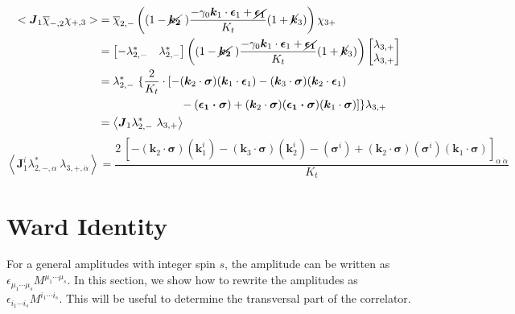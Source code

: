 \documentclass[11pt,a4paper]{article}
\begin{document}
\begin{align*}
< \boldsymbol{J}_{1}\overline{\chi }_{-,2} \chi _{+,3}>  & =\overline{\chi }_{2,-}\left( (1-\cancel{\boldsymbol{k_{2}}} \ )\frac{-\gamma _{0}\boldsymbol{k}_{1} \cdot \boldsymbol{\epsilon }_{1} +\cancel{\boldsymbol{\epsilon _{1}}}}{K_{t}} (1+\cancel{\boldsymbol{k}}_{3} )\right) \chi _{3+}\\
 & =\begin{bmatrix}
-\lambda _{2,-}^{*} & \lambda _{2,-}^{*}
\end{bmatrix}\left( (1-\cancel{\boldsymbol{k_{2}}} \ )\frac{-\gamma _{0}\boldsymbol{k}_{1} \cdot \boldsymbol{\epsilon }_{1} +\cancel{\boldsymbol{\epsilon _{1}}}}{K_{t}} (1+\cancel{\boldsymbol{k}}_{3} )\right)\begin{bmatrix}
\lambda _{3,+}\\
\lambda _{3,+}
\end{bmatrix}\\
 & =\lambda _{2,-}^{*} \ \{\frac{2}{K_{t}} \cdot [ -(\boldsymbol{k}_{2} \cdot \boldsymbol{\sigma })(\boldsymbol{k}_{1} \cdot \boldsymbol{\epsilon }_{1}) -(\boldsymbol{k}_{3} \cdot \boldsymbol{\sigma })(\boldsymbol{k}_{2} \cdot \boldsymbol{\epsilon }_{1})\\
 & \ \ \ \ \ \ \ \ \ \ \ \ \ \ \ \ \ \ \ \ \ \ -(\boldsymbol{\epsilon _{1} \cdot \sigma }) +(\boldsymbol{k}_{2} \cdot \boldsymbol{\sigma })(\boldsymbol{\epsilon _{1} \cdot \sigma })(\boldsymbol{k}_{1} \cdot \boldsymbol{\sigma })]\} \lambda _{3,+}\\
 & =\left< \boldsymbol{J}_{1} \lambda _{2,-}^{*} \ \lambda _{3,+}\right> 
\end{align*}
\begin{equation}
\left< \boldsymbol{J}_{1}^{i} \lambda _{2,-,\alpha }^{*} \ \lambda _{3,+,\dot{\alpha }}\right> =\frac{2\ \left[ -(\boldsymbol{k}_{2} \cdot \boldsymbol{\sigma })\left(\boldsymbol{k}_{1}^{i}\right) -(\boldsymbol{k}_{3} \cdot \boldsymbol{\sigma })\left(\boldsymbol{k}_{2}^{i}\right) -\left(\boldsymbol{\sigma }^{i}\right) +(\boldsymbol{k}_{2} \cdot \boldsymbol{\sigma })\left(\boldsymbol{\sigma }^{i}\right)(\boldsymbol{k}_{1} \cdot \boldsymbol{\sigma })\right]_{\alpha \ \dot{\alpha }}}{K_{t}}
\end{equation}

\section{Ward Identity}
For a general amplitudes with integer spin $s$, the amplitude can be written as $\epsilon_{\mu_1 \cdots \mu_s} M^{\mu_1 \cdots \mu_s}$. In this section, we show how to rewrite the amplitudes as $\epsilon_{i_1 \cdots i_s} M^{i_1 \cdots i_s}$. This will be useful to determine the transversal part of the correlator.
\end{document}
